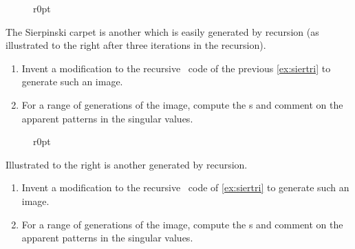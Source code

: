 \begin{exercise}  
\begin{figure}r{0pt}

\end{figure}
The Sierpinski carpet is another  which is easily generated by recursion (as illustrated to the right after three iterations in the recursion).

\begin{enumerate}
\item Invent a modification to the recursive \script\ code of the previous \cref{ex:siertri} to generate such an image.

\item For a range of generations of the image, compute the s and comment on the apparent patterns in the singular values.
\end{enumerate}
\end{exercise}


\begin{exercise}  
\begin{figure}r{0pt}

\end{figure}
Illustrated to the right is another  generated by recursion.

\begin{enumerate}
\item Invent a modification to the recursive \script\ code of \cref{ex:siertri} to generate such an image.

\item For a range of generations of the image, compute the s and comment on the apparent patterns in the singular values.
\end{enumerate}
\end{exercise}





